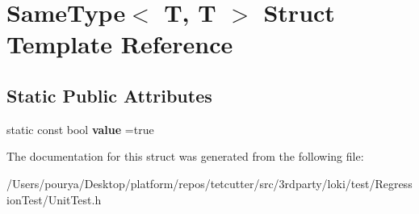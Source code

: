 \hypertarget{structSameType_3_01T_00_01T_01_4}{}\section{Same\+Type$<$ T, T $>$ Struct Template Reference}
\label{structSameType_3_01T_00_01T_01_4}
\subsection*{Static Public Attributes}
\begin{DoxyCompactItemize}
\item 
\hypertarget{structSameType_3_01T_00_01T_01_4_adbd41977d0723b8e2950c37224940efb}{}static const bool {\bfseries value} =true\label{structSameType_3_01T_00_01T_01_4_adbd41977d0723b8e2950c37224940efb}

\end{DoxyCompactItemize}


The documentation for this struct was generated from the following file\+:\begin{DoxyCompactItemize}
\item 
/\+Users/pourya/\+Desktop/platform/repos/tetcutter/src/3rdparty/loki/test/\+Regression\+Test/Unit\+Test.\+h\end{DoxyCompactItemize}
